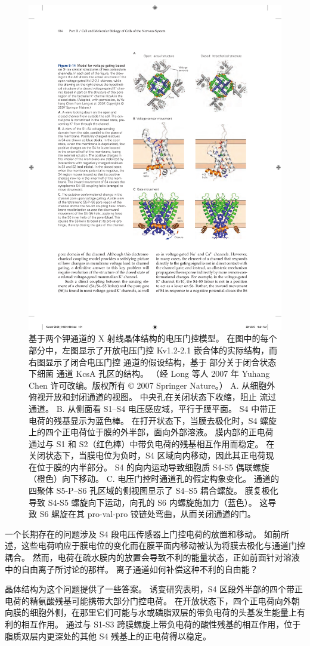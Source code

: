 \begin{figure}[htbp]
	\centering
	\includegraphics[width=0.6\linewidth]{chap08/fig_8_14}
	\caption{基于两个钾通道的 X 射线晶体结构的电压门控模型。 在图中的每个部分中，左图显示了开放电压门控 Kv1.2-2.1 嵌合体的实际结构，而右图显示了闭合电压门控  通道的假设结构，基于 部分关于闭合状态下细菌  通道 KcsA 孔区的结构。 （经 Long 等人 2007 年 Yuhang Chen 许可改编。版权所有 © 2007 Springer Nature。） A. 从细胞外俯视开放和封闭通道的视图。 中央孔在关闭状态下收缩，阻止  流过通道。 B. 从侧面看 S1–S4 电压感应域，平行于膜平面。 S4 中带正电荷的残基显示为蓝色棒。 在打开状态下，当膜去极化时，S4 螺旋上的四个正电荷位于膜的外半部，面向外部溶液。 膜内部的正电荷通过与 S1 和 S2（红色棒）中带负电荷的残基相互作用而稳定。 在关闭状态下，当膜电位为负时，S4 区域向内移动，因此其正电荷现在位于膜的内半部分。 S4 的向内运动导致细胞质 S4-S5 偶联螺旋（橙色）向下移动。 C. 电压门控时通道孔的假定构象变化。 通道的四聚体 S5-P–S6 孔区域的侧视图显示了 S4–S5 耦合螺旋。 膜复极化导致 S4-S5 螺旋向下运动，向孔的 S6 内螺旋施加力（蓝色）。 这导致 S6 螺旋在其 pro-val-pro 铰链处弯曲，从而关闭通道的门。}
	\label{fig:8_14}
\end{figure}


一个长期存在的问题涉及 S4 段电压传感器上门控电荷的放置和移动。
如前所述，这些电荷响应于膜电位的变化而在膜平面内移动被认为将膜去极化与通道门控耦合。
然而，电荷在疏水膜内的放置会导致不利的能量状态，正如前面针对溶液中的自由离子所讨论的那样。
离子通道如何补偿这种不利的自由能？


晶体结构为这个问题提供了一些答案。
诱变研究表明，S4 区段外半部的四个带正电荷的精氨酸残基可能携带大部分门控电荷。
在开放状态下，四个正电荷向外朝向膜的细胞外侧，在那里它们可能与水或磷脂双层的带负电荷的头基发生能量上有利的相互作用。
通过与 S1-S3 跨膜螺旋上带负电荷的酸性残基的相互作用，位于脂质双层内更深处的其他 S4 残基上的正电荷得以稳定。


